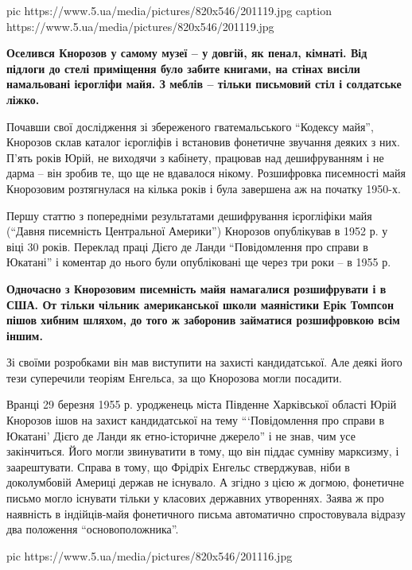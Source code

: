 \ifcmt
pic https://www.5.ua/media/pictures/820x546/201119.jpg
caption https://www.5.ua/media/pictures/820x546/201119.jpg
\fi

\begin{leftbar}
\bfseries
Оселився Кнорозов у самому музеї – у довгій, як пенал, кімнаті. Від
підлоги до стелі приміщення було забите книгами, на стінах висіли
намальовані ієрогліфи майя. З меблів – тільки письмовий стіл і
солдатське ліжко.
\end{leftbar}

Почавши свої дослідження зі збереженого гватемальського \enquote{Кодексу майя},
Кнорозов склав каталог ієрогліфів і встановив фонетичне звучання деяких з
них. П'ять років Юрій, не виходячи з кабінету, працював над дешифруванням
і не дарма – він зробив те, що ще не вдавалося нікому. Розшифровка
писемності майя Кнорозовим розтягнулася на кілька років і була завершена
аж на початку 1950-х.

Першу статтю з попередніми результатами дешифрування ієрогліфіки майя
(\enquote{Давня писемність Центральної Америки}) Кнорозов опублікував в 1952 р. у
віці 30 років. Переклад праці Дієго де Ланди \enquote{Повідомлення про справи в
Юкатані} і коментар до нього були опубліковані ще через три роки – в 1955
р.

\begin{leftbar}
\bfseries
Одночасно з Кнорозовим писемність майя намагалися розшифрувати і в США.
От тільки чільник американської школи маяністики Ерік Томпсон пішов
хибним шляхом, до того ж заборонив займатися розшифровкою всім іншим.
\end{leftbar}

Зі своїми розробками він мав виступити на захисті кандидатської. Але деякі
його тези суперечили теоріям Енгельса, за що Кнорозова могли посадити.

Вранці 29 березня 1955 р. уродженець міста Південне Харківської області
Юрій Кнорозов ішов на захист кандидатської на тему 
\enquote{\enquote{Повідомлення про справи в Юкатані} 
Дієго де Ланди як етно-історичне джерело} і не знав, чим
усе закінчиться. Його могли звинуватити в тому, що він піддає сумніву
марксизму, і заарештувати. Справа в тому, що Фрідріх Енгельс стверджував,
ніби в доколумбовій Америці держав не існувало. А згідно з цією ж догмою,
фонетичне письмо могло існувати тільки у класових державних утвореннях.
Заява ж про наявність в індійців-майя фонетичного письма автоматично
спростовувала відразу два положення \enquote{основоположника}.

\ifcmt
pic https://www.5.ua/media/pictures/820x546/201116.jpg
\fi

